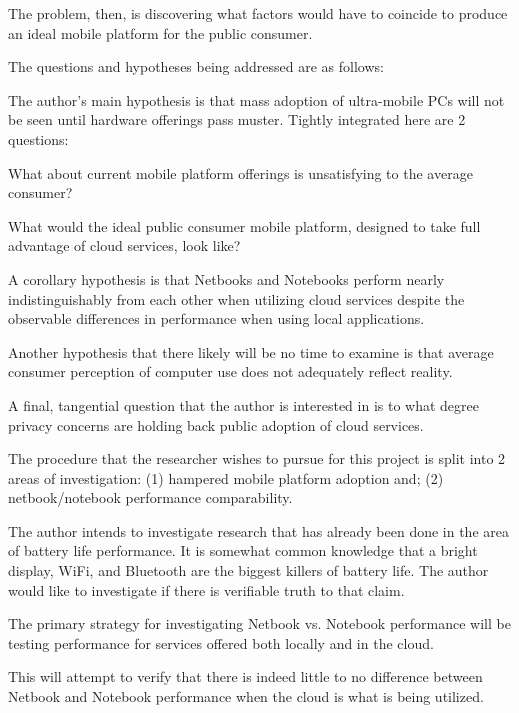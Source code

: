 The problem, then, is discovering what factors would have to coincide to produce
an ideal mobile platform for the public consumer.

The questions and hypotheses being addressed are as follows: 
\begin{inparaenum}[(1)]
  \item The author's main hypothesis is that mass adoption of ultra-mobile PCs
    will not be seen until hardware offerings pass muster.  Tightly integrated
    here are 2 questions:
    \begin{inparaenum}[(a)]
    \item What about current mobile platform offerings is unsatisfying to the
      average consumer?
    \item What would the ideal public consumer mobile platform, designed to take
      full advantage of cloud services, look like?
    \end{inparaenum}
  \item A corollary hypothesis is that Netbooks and Notebooks perform nearly
    indistinguishably from each other when utilizing cloud services despite the
    observable differences in performance when using local applications.
  \item Another hypothesis that there likely will be no time to examine is that
    average consumer perception of computer use does not adequately reflect
    reality.
  \item A final, tangential question that the author is interested in is to what
    degree privacy concerns are holding back public adoption of cloud services.
\end{inparaenum}

The procedure that the researcher wishes to pursue for this project is split
into 2 areas of investigation: (1) hampered mobile platform adoption and; (2)
netbook/notebook performance comparability.

The author intends to investigate research that has already been done in the
area of battery life performance.  It is somewhat common knowledge that a bright
display, WiFi, and Bluetooth are the biggest killers of battery life.  The
author would like to investigate if there is verifiable truth to that claim.

The primary strategy for investigating Netbook vs. Notebook performance will be
testing performance for services offered both locally and in the cloud.

This will attempt to verify that there is indeed little to no difference between
Netbook and Notebook performance when the cloud is what is being utilized.

